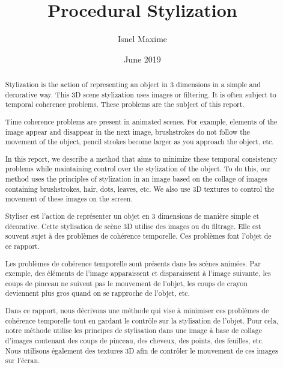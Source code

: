 \documentclass[12pt, a4paper]{memoir} %
\title{Procedural Stylization} %
\author{Isnel Maxime}
\date{June 2019} %
\begin{document}
\frontmatter
\begin{titlingpage}
\maketitle
\end{titlingpage}

\setlength{\parskip}{-1pt plus 1pt}

\renewcommand{\abstracttextfont}{\normalfont}
\abstractintoc
\begin{abstract}


Stylization is the action of representing an object in 3 dimensions in a simple and decorative way. This 3D scene stylization uses images or filtering. It is often subject to temporal coherence problems. These problems are the subject of this report.

Time coherence problems are present in animated scenes. For example, elements of the image appear and disappear in the next image, brushstrokes do not follow the movement of the object, pencil strokes become larger as you approach the object, etc.

In this report, we describe a method that aims to minimize these temporal consistency problems while maintaining control over the stylization of the object. To do this, our method uses the principles of stylization in an image based on the collage of images containing brushstrokes, hair, dots, leaves, etc. We also use 3D textures to control the movement of these images on the screen.

\end{abstract}
\abstractintoc



\renewcommand\abstractname{R\'esum\'e}
\begin{abstract} 

Styliser est l’action de représenter un objet en 3 dimensions de manière simple et décorative. Cette stylisation de scène 3D utilise des images ou du filtrage. Elle est souvent sujet à des problèmes de cohérence temporelle. Ces problèmes font l’objet de ce rapport.

Les problèmes de cohérence temporelle sont présents dans les scènes animées. Par exemple, des éléments de l’image apparaissent et disparaissent à l’image suivante, les coups de pinceau ne suivent pas le mouvement de l’objet, les coups de crayon deviennent plus gros quand on se rapproche de l’objet, etc.

Dans ce rapport, nous décrivons une méthode qui vise à minimiser ces problèmes de cohérence temporelle tout en gardant le contrôle sur la stylisation de l'objet. Pour cela, notre méthode utilise les principes de stylisation dans une image à base de collage d'images contenant des coups de pinceau, des cheveux, des points, des feuilles, etc. Nous utilisons également des textures 3D afin de contrôler le mouvement de ces images sur l'écran.

\end{abstract}
\end{document}
